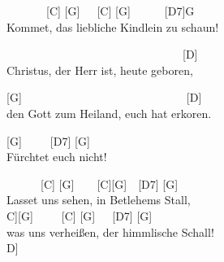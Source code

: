 \documentclass[
  letterpaper,
  a5paper]{memoir}
\begin{document}
~~~~~~~{[}C{]} {[}G{]}~~~{[}C{]} {[}G{]}~~~~~~{[}D7{]}G\\
Kommet, das liebliche Kindlein zu schaun!

~~~~~~~~~~~~~~~~~~~~~~~~~~~~~~~{[}D{]}\\
Christus, der Herr ist, heute geboren,

{[}G{]}~~~~~~~~~~~~~~~~~~~~~~~~~~~~~{[}D{]}\\
den Gott zum Heiland, euch hat erkoren.

{[}G{]}~~~~~{[}D7{]} {[}G{]}\\
Fürchtet euch nicht!

~~~~~~{[}C{]} {[}G{]}~~~~{[}C{]}{[}G{]}~~{[}D7{]} {[}G{]}\\
Lasset uns sehen, in Betlehems Stall,\\
\hspace*{0.333em}\hspace*{0.333em}\hspace*{0.333em}\hspace*{0.333em}\hspace*{0.333em}\hspace*{0.333em}\hspace*{0.333em}{[}C{]}{[}G{]}~~~~~{[}C{]}
{[}G{]}~~~{[}D7{]} {[}G{]}\\
was uns verheißen, der himmlische Schall!\\
\hspace*{0.333em}\hspace*{0.333em}\hspace*{0.333em}\hspace*{0.333em}\hspace*{0.333em}\hspace*{0.333em}\hspace*{0.333em}\hspace*{0.333em}\hspace*{0.333em}\hspace*{0.333em}\hspace*{0.333em}\hspace*{0.333em}\hspace*{0.333em}\hspace*{0.333em}\hspace*{0.333em}\hspace*{0.333em}\hspace*{0.333em}\hspace*{0.333em}\hspace*{0.333em}\hspace*{0.333em}\hspace*{0.333em}\hspace*{0.333em}\hspace*{0.333em}\hspace*{0.333em}\hspace*{0.333em}\hspace*{0.333em}\hspace*{0.333em}\hspace*{0.333em}\hspace*{0.333em}\hspace*{0.333em}\hspace*{0.333em}{[}D{]}\\
\end{document}
